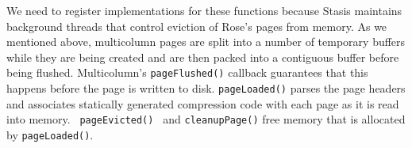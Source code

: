 \documentclass{vldb}
\newcommand{\rows}{Rose\xspace}
\newcommand{\rowss}{Rose's\xspace}
\begin{document}




We need to register implementations for these functions because
Stasis maintains background threads that control eviction
of \rowss pages from memory.  As we mentioned above, multicolumn pages
are split into a number of temporary buffers while they are being
created and are then packed into a contiguous buffer before being
flushed.  Multicolumn's {\tt pageFlushed()} callback guarantees that
this happens before the page is written to disk.  {\tt pageLoaded()}
parses the page headers and associates statically generated
compression code with each page as it is read into memory.  {\tt
  pageEvicted() } and {\tt cleanupPage()} free memory that is
allocated by {\tt pageLoaded()}.


\end{document}
